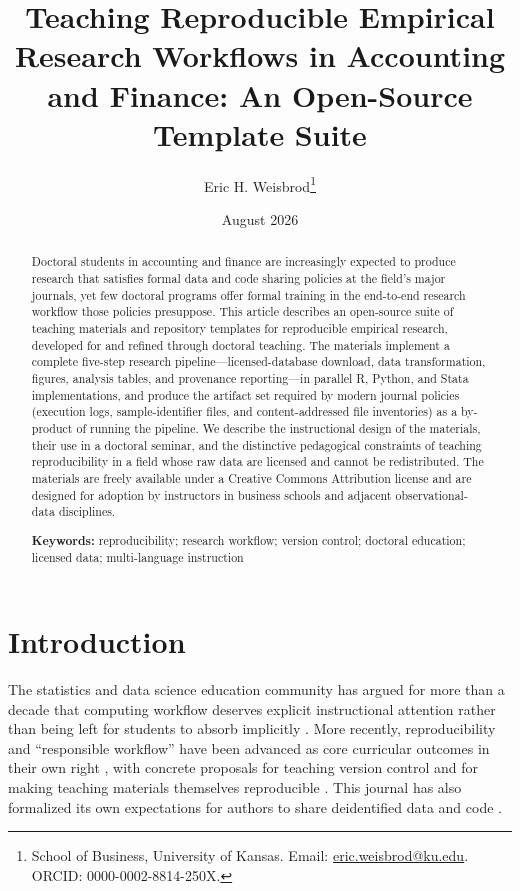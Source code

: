 \documentclass[12pt]{article}
\title{\bfseries Teaching Reproducible Empirical Research Workflows in
Accounting and Finance: An Open-Source Template Suite}
\author{}
\date{}
\author{Eric H. Weisbrod\thanks{School of Business, University of Kansas.
  Email: \href{mailto:eric.weisbrod@ku.edu}{eric.weisbrod@ku.edu}.
  ORCID: 0000-0002-8814-250X.}}
\date{August 2026}
\begin{document}
\maketitle

\begin{abstract}
\noindent
Doctoral students in accounting and finance are increasingly expected to
produce research that satisfies formal data and code sharing policies at
the field's major journals, yet few doctoral programs offer formal
training in the end-to-end research workflow those policies presuppose.
This article describes an open-source suite of teaching materials and
repository templates for reproducible empirical research, developed for
and refined through doctoral teaching. The materials implement a complete
five-step research pipeline---licensed-database download, data
transformation, figures, analysis tables, and provenance
reporting---in parallel R, Python, and Stata implementations, and produce
the artifact set required by modern journal policies (execution logs,
sample-identifier files, and content-addressed file inventories) as a
by-product of running the pipeline. We describe the instructional design
of the materials, their use in a doctoral seminar, and the distinctive
pedagogical constraints of teaching reproducibility in a field whose raw
data are licensed and cannot be redistributed. The materials are freely
available under a Creative Commons Attribution license and are designed
for adoption by instructors in business schools and adjacent
observational-data disciplines.

\vspace{1em}
\noindent\textbf{Keywords:} reproducibility; research workflow; version
control; doctoral education; licensed data; multi-language instruction
\end{abstract}

\newpage

\section{Introduction}

The statistics and data science education community has argued for more
than a decade that computing workflow deserves explicit instructional
attention rather than being left for students to absorb implicitly
\citep{nolan2010computing, cetinkayarundel2018infrastructure}. More
recently, reproducibility and ``responsible workflow'' have been advanced
as core curricular outcomes in their own right
\citep{horton2022growing}, with concrete proposals for teaching version
control \citep{bryan2018version, beckman2021git} and for making teaching
materials themselves reproducible \citep{dogucu2022reproducible}. This
journal has also formalized its own expectations for authors to share
deidentified data and code \citep{horton2024editorial}.
\end{document}
